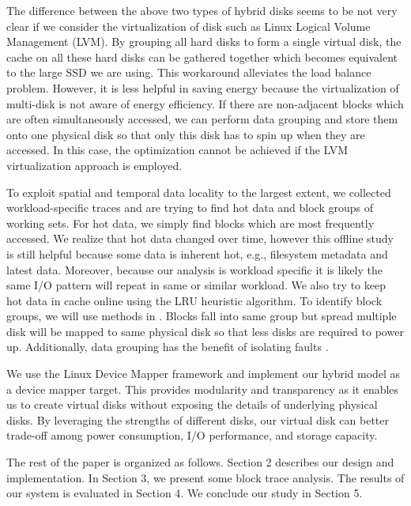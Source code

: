 The difference between the above two types of hybrid disks seems to be
not very clear if we consider the virtualization of disk such as Linux
Logical Volume Management (LVM). By grouping all hard disks to form a
single virtual disk, the cache on all these hard disks can be gathered
together which becomes equivalent to the large SSD we are using. This
workaround alleviates the load balance problem. However, it is less
helpful in saving energy because the virtualization of multi-disk is
not aware of energy efficiency. If there are non-adjacent blocks which
are often simultaneously accessed, we can perform data grouping and
store them onto one physical disk so that only this disk has to spin
up when they are accessed. In this case, the optimization cannot be
achieved if the LVM virtualization approach is employed. 

To exploit spatial and temporal data locality to the largest extent,
we collected workload-specific traces and are trying to find hot data
and block groups of working sets. For hot data, we simply find blocks
which are most frequently accessed. We realize that hot data changed
over time, however this offline study is still helpful because some
data is inherent hot, e.g., filesystem metadata and latest data.
Moreover, because our analysis is workload specific it is likely the
same I/O pattern will repeat in same or similar workload. We also try
to keep hot data in cache online using the LRU heuristic algorithm. To
identify block groups, we will use methods in \cite{Wildani_grouping}.
Blocks fall into same group but spread multiple disk will be mapped to
same physical disk so that less disks are required to power up.
Additionally, data grouping has the benefit of isolating faults
\cite{Sivathanu_dgraid, Wildani_grouping}. 

We use the Linux Device Mapper framework and implement our hybrid
model as a device mapper target. This provides modularity and
transparency as it enables us to create virtual disks without exposing
the details of underlying physical disks. By leveraging the strengths
of different disks, our virtual disk can better trade-off among power
consumption, I/O performance, and storage capacity.

The rest of the paper is organized as follows. Section 2 describes our
design and implementation. In Section 3, we present some block trace
analysis. The results of our system is evaluated in Section 4. We
conclude our study in Section 5.


